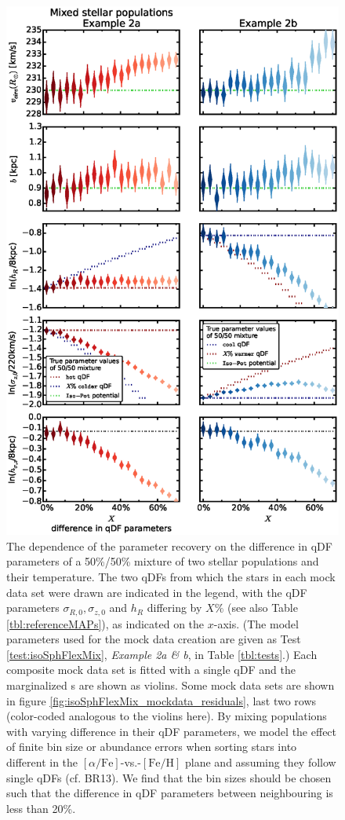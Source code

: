 \begin{figure}[!htbp]
\centering
\includegraphics[scale=0.45]{figs/isoSphFlexMixDiff_violins_2.eps}
\caption{The dependence of the parameter recovery on the difference in qDF parameters of a 50\%/50\% mixture of two stellar populations and their temperature. The two qDFs from which the stars in each mock data set were drawn are indicated in the legend, with the qDF parameters $\sigma_{R,0}, \sigma_{z,0}$ and $h_R$ differing by $X\%$ (see also Table \ref{tbl:referenceMAPs}), as indicated on the $x$-axis. (The model parameters used for the mock data creation are given as Test \ref{test:isoSphFlexMix}, \emph{Example 2a \& b}, in Table \ref{tbl:tests}.) Each composite mock data set is fitted with a single qDF and the marginalized \pdf{}s are shown as violins. Some mock data sets are shown in figure \ref{fig:isoSphFlexMix_mockdata_residuals}, last two rows (color-coded analogous to the violins here). By mixing populations with varying difference in their qDF parameters, we model the effect of finite bin size or abundance errors when sorting stars into different \MAPs{} in the $[\alpha/\mathrm{Fe}]$-vs.-$[\mathrm{Fe}/\mathrm{H}]$ plane and assuming they follow single qDFs (cf. BR13). We find that the bin sizes should be chosen such that the difference in qDF parameters between neighbouring \MAPs{} is less than 20\%. } 

\end{figure}
